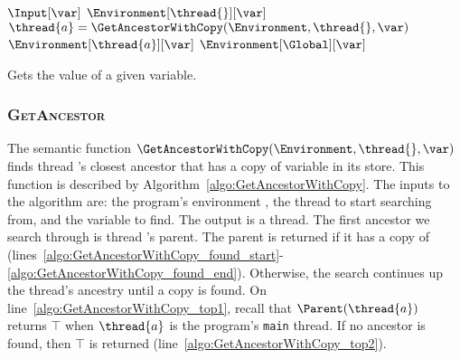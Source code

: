\begin{algorithm}[t]
	\begin{algorithmic}[1]
		\Function{$\GetVal$}{\Environment{}, \Input{}, \thread{}, \var{}}
			\If {$\var \in \Input$}
				\State \Return $\Input[\var]$											\label{algo:GetVal_input}
			\Else
				\If {$\var \in \Environment[\thread{}]$}	
					\State \Return $\Environment[\thread{}][\var]$							\label{algo:GetVal_local}
				\Else
					\State $\thread{a} = \GetAncestorWithCopy(\Environment, \thread{}, \var)$
						\State \Return $\Environment[\thread{a}][\var]$						\label{algo:GetVal_parent}
					\Else
						\State \Return $\Environment[\Global][\var]$						\label{algo:GetVal_global}
					\EndIf
				\EndIf
			\EndIf
		\EndFunction
	\end{algorithmic}
	
	\caption{Gets the value of a given variable.}
	\label{algo:GetVal}
\end{algorithm}

\subsubsection{\textsc{GetAncestor}}
\label{sec:forec_GetAncestorWithCopy}
The semantic function $\GetAncestorWithCopy(\Environment, \thread{}, \var)$ 
finds thread \thread{}'s closest ancestor that has a copy 
of variable \var{} in its store. This function is described 
by Algorithm~\ref{algo:GetAncestorWithCopy}. The inputs
to the algorithm are: the program's environment 
\Environment{}, the thread \thread{} to start searching 
from, and the variable \var{} to find. The output is a
thread. The first ancestor we search through is thread 
\thread{}'s parent. The parent is returned if it has a 
copy of \var{} (lines~\ref{algo:GetAncestorWithCopy_found_start}-\ref{algo:GetAncestorWithCopy_found_end}). 
Otherwise, the search continues 
up the thread's ancestry until a copy is found. On
line~\ref{algo:GetAncestorWithCopy_top1}, recall that 
$\Parent(\thread{a})$ returns $\top$ when $\thread{a}$ is 
the program's \verb$main$ thread. If no ancestor is found, 
then $\top$ is returned (line~\ref{algo:GetAncestorWithCopy_top2}).

